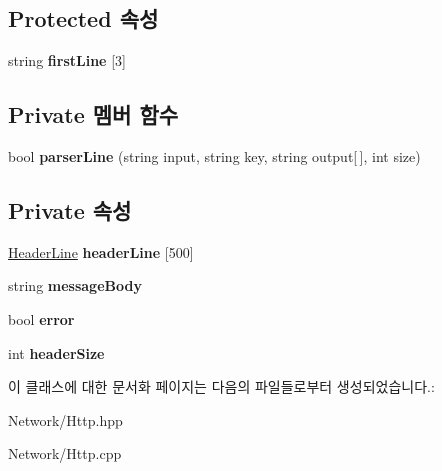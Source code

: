 \subsection*{Protected 속성}
\begin{DoxyCompactItemize}
\item 
\mbox{\label{class_http_message_aa7ad90849c8df65b3260725b015f5256}} 
string {\bfseries first\+Line} \mbox{[}3\mbox{]}
\end{DoxyCompactItemize}
\subsection*{Private 멤버 함수}
\begin{DoxyCompactItemize}
\item 
\mbox{\label{class_http_message_af806f3a54030bf45033fb51bb006c742}} 
bool {\bfseries parser\+Line} (string input, string key, string output\mbox{[}$\,$\mbox{]}, int size)
\end{DoxyCompactItemize}
\subsection*{Private 속성}
\begin{DoxyCompactItemize}
\item 
\mbox{\label{class_http_message_a3bfa478f8060697b81302641535ee642}} 
\hyperlink{struct_header_line}{Header\+Line} {\bfseries header\+Line} \mbox{[}500\mbox{]}
\item 
\mbox{\label{class_http_message_ab4ace05a1b827df046db1a358a8c55bb}} 
string {\bfseries message\+Body}
\item 
\mbox{\label{class_http_message_aedde7947cf32eac14ae98815f7298be4}} 
bool {\bfseries error}
\item 
\mbox{\label{class_http_message_aceb0bc8791d5213c4fb676be5fe2d079}} 
int {\bfseries header\+Size}
\end{DoxyCompactItemize}


이 클래스에 대한 문서화 페이지는 다음의 파일들로부터 생성되었습니다.\+:\begin{DoxyCompactItemize}
\item 
Network/Http.\+hpp\item 
Network/Http.\+cpp\end{DoxyCompactItemize}
